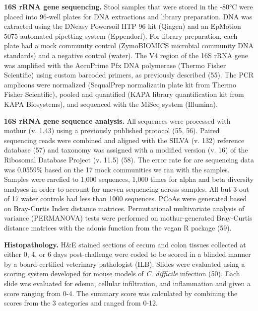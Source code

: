 \documentclass[
  11pt,
]{article}
\begin{document}
\textbf{16S rRNA gene sequencing.} Stool samples that were stored in the
-80°C were placed into 96-well plates for DNA extractions and library
preparation. DNA was extracted using the DNeasy Powersoil HTP 96 kit
(Qiagen) and an EpMotion 5075 automated pipetting system (Eppendorf).
For library preparation, each plate had a mock community control
(ZymoBIOMICS microbial community DNA standards) and a negative control
(water). The V4 region of the 16S rRNA gene was amplified with the
AccuPrime Pfx DNA polymerase (Thermo Fisher Scientific) using custom
barcoded primers, as previously described (55). The PCR amplicons were
normalized (SequalPrep normalizatin plate kit from Thermo Fisher
Scientific), pooled and quantified (KAPA library quantification kit from
KAPA Biosystems), and sequenced with the MiSeq system (Illumina).

\textbf{16S rRNA gene sequence analysis.} All sequences were processed
with mothur (v. 1.43) using a previously published protocol (55, 56).
Paired sequencing reads were combined and aligned with the SILVA (v.
132) reference database (57) and taxonomy was assigned with a modified
version (v. 16) of the Ribosomal Database Project (v. 11.5) (58). The
error rate for are sequencing data was 0.0559\% based on the 17 mock
communities we ran with the samples. Samples were rarefied to 1,000
sequences, 1,000 times for alpha and beta diversity analyses in order to
account for uneven sequencing across samples. All but 3 out of 17 water
controls had less than 1000 sequences. PCoAs were generated based on
Bray-Curtis Index distance matrices. Permutational multivariate analysis
of variance (PERMANOVA) tests were performed on mothur-generated
Bray-Curtis distance matrices with the adonis function from the vegan R
package (59).

\textbf{Histopathology.} H\&E stained sections of cecum and colon
tissues collected at either 0, 4, or 6 days post-challenge were coded to
be scored in a blinded manner by a board-certified veterinary
pathologist (ILB). Slides were evaluated using a scoring system
developed for mouse models of \emph{C. difficile} infection (50). Each
slide was evaluated for edema, cellular infiltration, and inflammation
and given a score ranging from 0-4. The summary score was calculated by
combining the scores from the 3 categories and ranged from 0-12.
\end{document}
